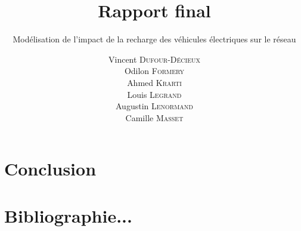 \documentclass[12pt]{article}
\title{Rapport final}
\subtitle{Modélisation de l'impact de la recharge des véhicules électriques sur le réseau}
\author{ Vincent \textsc{Dufour-Décieux} \\ Odilon \textsc{Formery} \\ Ahmed \textsc{Krarti} \\ Louis \textsc{Legrand} \\ Augustin \textsc{Lenormand} \\ Camille \textsc{Masset} }
\begin{document}
\maketitle

\newpage
\renewcommand{\thepage}{}
\thispagestyle{empty}
\null
\newpage

\renewcommand{\thepage}{\arabic{page}}
\setcounter{page}{1}











\section*{Conclusion}

\section*{Bibliographie...}
\end{document}
